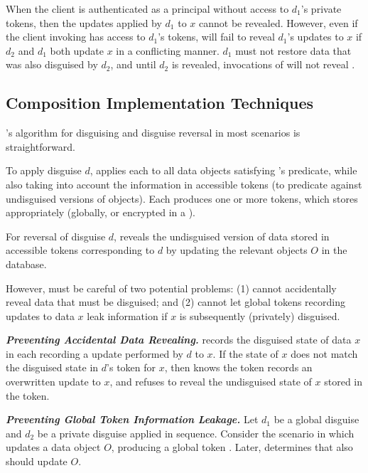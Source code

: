 When the client is authenticated as a principal without access to $d_1$'s private tokens, then the
updates applied by $d_1$ to $x$ cannot be revealed.  However, even if the client invoking 
has access to $d_1$'s tokens, \sys will fail to reveal $d_1$'s updates to $x$ if $d_2$ and $d_1$
both update $x$ in a conflicting manner. $d_1$ must not restore data that was also disguised by
$d_2$, and until $d_2$ is revealed, invocations of  will not reveal \xstart.

\subsection{Composition Implementation Techniques}
\sys's algorithm for disguising and disguise reversal in most scenarios is straightforward. 

To apply disguise $d$, \sys applies each  to all
data objects satisfying 's predicate, while also taking into account the information in
accessible tokens (to \eg predicate against undisguised versions of objects). Each  produces
one or more tokens, which \sys stores appropriately (globally, or encrypted in a ).

For reversal of disguise $d$, \sys reveals the undisguised version of data stored in accessible tokens
corresponding to $d$ by updating the relevant objects $O$ in the database.

However, \sys must be careful of two potential problems:
(1) \sys cannot accidentally reveal data that must be disguised; and (2) \sys cannot let global
tokens recording updates to data $x$ leak information if $x$ is subsequently (privately) disguised.

\vspace{6pt}\noindent\textbf{\emph{Preventing Accidental Data Revealing.}}
\sys records the disguised state of data $x$ in each  recording a update performed by $d$
to $x$. If the state of $x$ does not match the disguised state in $d$'s token for $x$, then \sys
knows the token records an overwritten update to $x$, and refuses to reveal the undisguised state of $x$
stored in the token.

\vspace{6pt}\noindent\textbf{\emph{Preventing Global Token Information Leakage.}}
%
Let $d_1$ be a global disguise and $d_2$ be a private disguise applied in sequence.  Consider the
scenario in which  updates a data object $O$, producing a global token . Later,
\sys determines that  also should update $O$.

